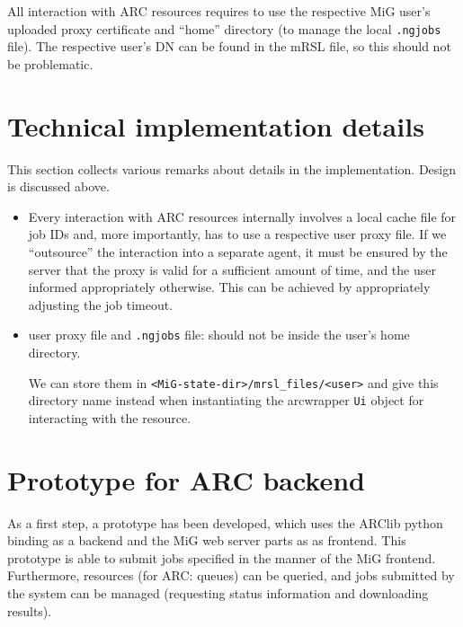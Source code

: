 \documentclass[11pt]{article}
\begin{document}
All interaction with ARC resources requires to use the respective MiG
user's uploaded proxy certificate and ``home'' directory (to manage
the local \texttt{.ngjobs} file). The respective user's DN can be
found in the mRSL file, so this should not be problematic.

\section{Technical implementation details}

This section collects various remarks about details in the
implementation. Design is discussed above.

\begin{itemize}
  \item Every interaction with ARC resources internally involves a
    local cache file for job IDs and, more importantly, has to use a
    respective user proxy file. If we ``outsource'' the interaction
    into a separate agent, it must be ensured by the server that the
    proxy is valid for a sufficient amount of time, and the user
    informed appropriately otherwise.
    This can be achieved by appropriately adjusting the job timeout.

  \item user proxy file and \texttt{.ngjobs} file: 
    should not be inside the user's home directory.

    We can store them in \texttt{<MiG-state-dir>/mrsl\_files/<user>}
    and give this directory name instead when instantiating the
    arcwrapper \texttt{Ui} object for interacting with the resource.

\end{itemize}








\section{Prototype for ARC backend}

As a first step, a prototype has been developed, which uses the ARClib
python binding as a backend and the MiG web server parts as as
frontend. This prototype is able to submit jobs specified in the
manner of the MiG frontend. Furthermore, resources (for ARC: queues)
can be queried, and jobs submitted by the system can be managed
(requesting status information and downloading results).
\end{document}
